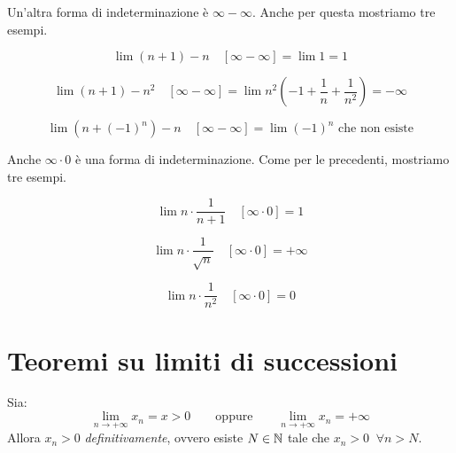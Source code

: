 Un'altra forma di indeterminazione è $\infty - \infty$. Anche per questa mostriamo tre esempi.
\begin{example}
\begin{equation*}
\lim (n+1) - n \quad [\infty - \infty] = \lim 1 = 1
\end{equation*}
\end{example}

\begin{example}
\begin{equation*}
\lim (n+1) - n^2 \quad [\infty - \infty] = \lim n^2\left(-1+\frac{1}{n}+\frac{1}{n^2}\right) = -\infty
\end{equation*}
\end{example}

\begin{example}
\begin{equation*}
\lim (n+(-1)^n) - n \quad [\infty - \infty] = \lim (-1)^n \text{ che non esiste}
\end{equation*}
\end{example}

Anche $\infty \cdot 0$ è una forma di indeterminazione. Come per le precedenti, mostriamo tre esempi.

\begin{example}
\begin{equation*}
\lim n \cdot \frac{1}{n+1} \quad [\infty \cdot 0] = 1
\end{equation*}
\end{example}

\begin{example}
\begin{equation*}
\lim n \cdot \frac{1}{\sqrt{n}} \quad [\infty \cdot 0] = +\infty
\end{equation*}
\end{example}

\begin{example}
\begin{equation*}
\lim n \cdot \frac{1}{n^2} \quad [\infty \cdot 0] = 0
\end{equation*}
\end{example}

\section{Teoremi su limiti di successioni}
\begin{theorem}
Sia:
\begin{equation*}
\lim_{n \to +\infty}{x_n} = x > 0 \qquad \text{oppure} \qquad \lim_{n \to +\infty}{x_n} = +\infty
\end{equation*}
Allora $x_n > 0$ \emph{definitivamente}, ovvero esiste $N \in \mathbb N$ tale che $x_n > 0 \;\; \forall n > N$.
\end{theorem}

